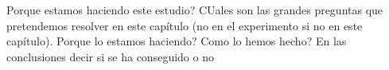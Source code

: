 Porque estamos haciendo este estudio?
CUales son las grandes preguntas que pretendemos resolver en este capítulo (no en el experimento si no en este capítulo). Porque lo estamos haciendo?
Como lo hemos hecho?
En las conclusiones decir si se ha conseguido o no